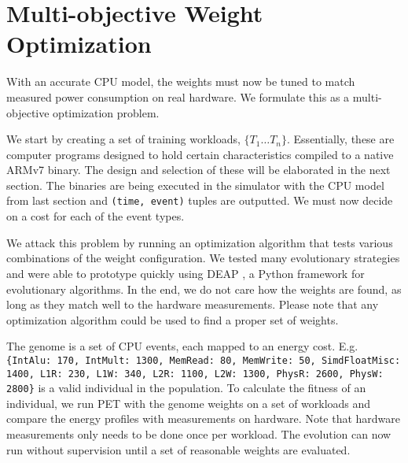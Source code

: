 \section{Multi-objective Weight Optimization}

With an accurate CPU model, the weights must now be tuned to match measured
power consumption on real hardware. We formulate this as a multi-objective
optimization problem.

We start by creating a set of training workloads, $\{T_1 \dots T_n \}$.
Essentially, these are computer programs designed to hold certain
characteristics compiled to a native ARMv7 binary. The design and selection of
these will be elaborated in the next section. The binaries are being executed in
the simulator with the CPU model from last section and \texttt{(time,
event)} tuples are outputted. We must now decide on a cost for each of the event
types.

We attack this problem by running an optimization
algorithm that tests various combinations of the weight configuration. We tested
many evolutionary strategies and were able to prototype quickly using DEAP
\cite{DEAP_JMLR2012}, a Python framework for evolutionary algorithms. In the
end, we do not care how the weights are found, as long as they match well to the
hardware measurements. Please note that any optimization algorithm could be used
to find a proper set of weights.

The genome is a set of CPU events, each mapped to an energy cost. E.g.
\texttt{\{IntAlu: 170, IntMult: 1300, MemRead: 80, MemWrite: 50, SimdFloatMisc:
1400, L1R: 230, L1W: 340, L2R: 1100, L2W: 1300, PhysR: 2600, PhysW: 2800\}} is a
valid individual in the population. To calculate the fitness of an individual,
we run PET with the genome weights on a set of workloads and compare the energy
profiles with measurements on hardware. Note that hardware measurements only
needs to be done once per workload. The evolution can now run without
supervision until a set of reasonable weights are evaluated.
